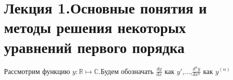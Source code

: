 \documentclass[document.tex]{subfiles}
\begin{document}
\section*{Лекция 1.Основные понятия и методы решения некоторых уравнений первого порядка}
Рассмотрим функцию $y:\mathbb{R}\mapsto\mathbb{C}$.Будем обозначать $\frac{dy}{dx}$ как $y'$,...,$\frac{d^ny}{dx^n}$ как $y^(n)$
\end{document}

